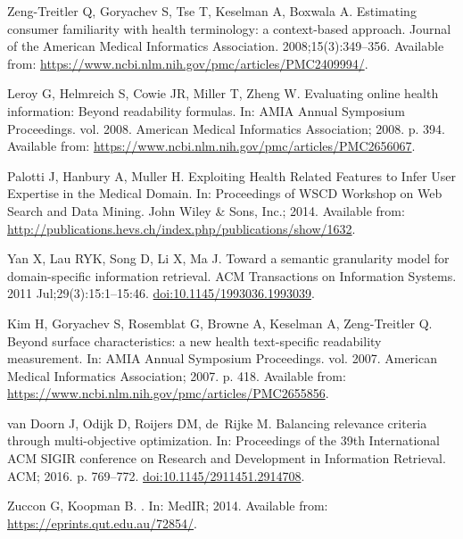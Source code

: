 \documentclass[10pt,a4paper]{article}
\begin{document}
\begin{thebibliography}{10}
	Zeng-Treitler Q, Goryachev S, Tse T, Keselman A, Boxwala A.
	\newblock Estimating consumer familiarity with health terminology: a
	context-based approach.
	\newblock Journal of the American Medical Informatics Association.
	2008;15(3):349--356.
	\newblock Available from:
	\url{https://www.ncbi.nlm.nih.gov/pmc/articles/PMC2409994/}.
	
	Leroy G, Helmreich S, Cowie JR, Miller T, Zheng W.
	\newblock Evaluating online health information: Beyond readability formulas.
	\newblock In: AMIA Annual Symposium Proceedings. vol. 2008. American Medical
	Informatics Association; 2008. p. 394.
	\newblock Available from:
	\url{https://www.ncbi.nlm.nih.gov/pmc/articles/PMC2656067}.
	
	Palotti J, Hanbury A, Muller H.
	\newblock Exploiting Health Related Features to Infer User Expertise in the
	Medical Domain.
	\newblock In: Proceedings of WSCD Workshop on Web Search and Data Mining. John
	Wiley \& Sons, Inc.; 2014. Available from:
	\url{http://publications.hevs.ch/index.php/publications/show/1632}.
	
	Yan X, Lau RYK, Song D, Li X, Ma J.
	\newblock Toward a semantic granularity model for domain-specific information
	retrieval.
	\newblock ACM Transactions on Information Systems. 2011 Jul;29(3):15:1--15:46.
	\newblock \href {http://dx.doi.org/10.1145/1993036.1993039}
	{doi:10.1145/1993036.1993039}.
	
	Kim H, Goryachev S, Rosemblat G, Browne A, Keselman A, Zeng-Treitler Q.
	\newblock Beyond surface characteristics: a new health text-specific
	readability measurement.
	\newblock In: AMIA Annual Symposium Proceedings. vol. 2007. American Medical
	Informatics Association; 2007. p. 418.
	\newblock Available from:
	\url{https://www.ncbi.nlm.nih.gov/pmc/articles/PMC2655856}.
	
	van Doorn J, Odijk D, Roijers DM, de~Rijke M.
	\newblock Balancing relevance criteria through multi-objective optimization.
	\newblock In: Proceedings of the 39th International ACM SIGIR conference on
	Research and Development in Information Retrieval. ACM; 2016. p. 769--772.
	\newblock \href {http://dx.doi.org/10.1145/2911451.2914708}
	{doi:10.1145/2911451.2914708}.
	
	Zuccon G, Koopman B.
	.
	\newblock In: MedIR; 2014. Available from:
	\url{https://eprints.qut.edu.au/72854/}.
	

\end{thebibliography}
\end{document}

